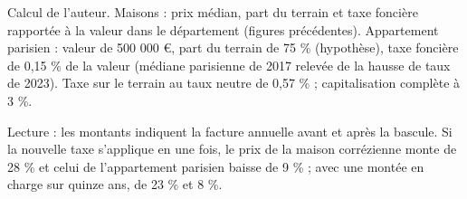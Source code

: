 Calcul de l'auteur. Maisons : prix médian, part du terrain et taxe foncière rapportée à la valeur dans le département (figures précédentes). Appartement parisien : valeur de 500 000 \euro{}, part du terrain de 75 \% (hypothèse), taxe foncière de 0,15 \% de la valeur (médiane parisienne de 2017 relevée de la hausse de taux de 2023). Taxe sur le terrain au taux neutre de 0,57 \% ; capitalisation complète à 3 \%.\par Lecture : les montants indiquent la facture annuelle avant et après la bascule. Si la nouvelle taxe s'applique en une fois, le prix de la maison corrézienne monte de 28 \% et celui de l'appartement parisien baisse de 9 \% ; avec une montée en charge sur quinze ans, de 23 \% et 8 \%.
